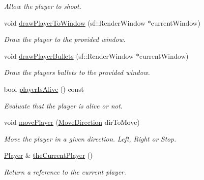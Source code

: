 \begin{DoxyCompactItemize}
\begin{DoxyCompactList}\small\item\em Allow the player to shoot. \end{DoxyCompactList}\item 
void \hyperlink{class_player_manager_a8dfbc91721f7c9cfeae80ae7fa89602e}{draw\+Player\+To\+Window} (sf\+::\+Render\+Window $\ast$current\+Window)
\begin{DoxyCompactList}\small\item\em Draw the player to the provided window. \end{DoxyCompactList}\item 
void \hyperlink{class_player_manager_a503d878624b53851c6fa25559630f544}{draw\+Player\+Bullets} (sf\+::\+Render\+Window $\ast$current\+Window)
\begin{DoxyCompactList}\small\item\em Draw the player\textquotesingle{}s bullets to the provided window. \end{DoxyCompactList}\item 
\mbox{\label{class_player_manager_ab927a10c2c602c42daf2e11eb8861692}} 
bool \hyperlink{class_player_manager_ab927a10c2c602c42daf2e11eb8861692}{player\+Is\+Alive} () const
\begin{DoxyCompactList}\small\item\em Evaluate that the player is alive or not. \end{DoxyCompactList}\item 
void \hyperlink{class_player_manager_a95358a4f97cf343f5d5d01a440c5dc76}{move\+Player} (\hyperlink{_player_manager_8h_a00ec4eba48da32d6cbdf827185fd3d34}{Move\+Direction} dir\+To\+Move)
\begin{DoxyCompactList}\small\item\em Move the player in a given direction. Left, Right or Stop. \end{DoxyCompactList}\item 
\mbox{\label{class_player_manager_aa70cd9ab8f7a582c27bef02e12a408e7}} 
\hyperlink{class_player}{Player} \& \hyperlink{class_player_manager_aa70cd9ab8f7a582c27bef02e12a408e7}{the\+Current\+Player} ()
\begin{DoxyCompactList}\small\item\em Return a reference to the current player. \end{DoxyCompactList}\item 

\end{DoxyCompactItemize}
